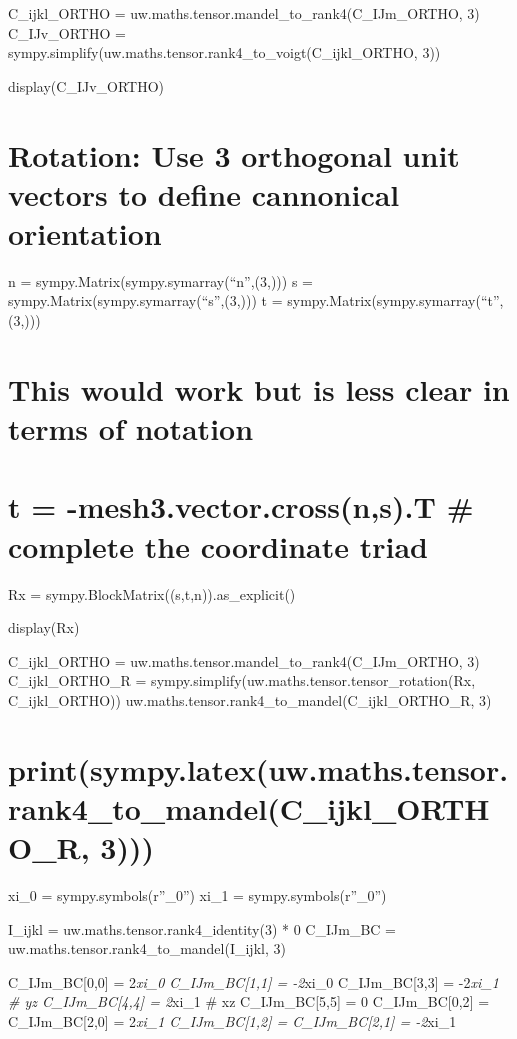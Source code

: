 \documentclass[
  letterpaper,
  DIV=11,
  numbers=noendperiod]{scrreprt}
\begin{document}
C\_ijkl\_ORTHO = uw.maths.tensor.mandel\_to\_rank4(C\_IJm\_ORTHO, 3)
C\_IJv\_ORTHO =
sympy.simplify(uw.maths.tensor.rank4\_to\_voigt(C\_ijkl\_ORTHO, 3))

display(C\_IJv\_ORTHO)

\chapter{Rotation: Use 3 orthogonal unit vectors to define cannonical
orientation}\label{rotation-use-3-orthogonal-unit-vectors-to-define-cannonical-orientation}

n = sympy.Matrix(sympy.symarray(``n'',(3,))) s =
sympy.Matrix(sympy.symarray(``s'',(3,))) t =
sympy.Matrix(sympy.symarray(``t'',(3,)))

\chapter{This would work but is less clear in terms of
notation}\label{this-would-work-but-is-less-clear-in-terms-of-notation}

\chapter{t = -mesh3.vector.cross(n,s).T \# complete the coordinate
triad}\label{t--mesh3.vector.crossns.t-complete-the-coordinate-triad}

Rx = sympy.BlockMatrix((s,t,n)).as\_explicit()

display(Rx)

C\_ijkl\_ORTHO = uw.maths.tensor.mandel\_to\_rank4(C\_IJm\_ORTHO, 3)
C\_ijkl\_ORTHO\_R = sympy.simplify(uw.maths.tensor.tensor\_rotation(Rx,
C\_ijkl\_ORTHO)) uw.maths.tensor.rank4\_to\_mandel(C\_ijkl\_ORTHO\_R, 3)

\chapter{print(sympy.latex(uw.maths.tensor.rank4\_to\_mandel(C\_ijkl\_ORTHO\_R,
3)))}\label{printsympy.latexuw.maths.tensor.rank4_to_mandelc_ijkl_ortho_r-3}

xi\_0 = sympy.symbols(r''\xi\_0'') xi\_1 = sympy.symbols(r''\xi\_0'')

I\_ijkl = uw.maths.tensor.rank4\_identity(3) * 0 C\_IJm\_BC =
uw.maths.tensor.rank4\_to\_mandel(I\_ijkl, 3)

C\_IJm\_BC{[}0,0{]} = 2\emph{xi\_0 C\_IJm\_BC{[}1,1{]} = -2}xi\_0
C\_IJm\_BC{[}3,3{]} = -2\emph{xi\_1 \# yz C\_IJm\_BC{[}4,4{]} = 2}xi\_1
\# xz C\_IJm\_BC{[}5,5{]} = 0 C\_IJm\_BC{[}0,2{]} = C\_IJm\_BC{[}2,0{]}
= 2\emph{xi\_1 C\_IJm\_BC{[}1,2{]} = C\_IJm\_BC{[}2,1{]} = -2}xi\_1
\end{document}
